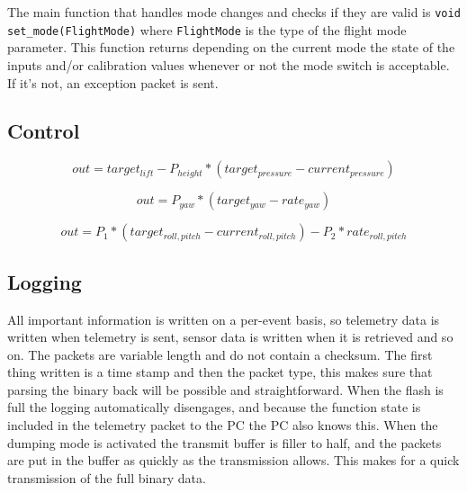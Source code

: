 \documentclass[final]{article}
\begin{document}
The main function that handles mode changes and checks if they are valid is \texttt{void set\_mode(FlightMode)} where \texttt{FlightMode} is the type of the flight mode parameter.
This function returns depending on the current mode the state of the inputs and/or calibration values whenever or not the mode switch is acceptable.
If it's not, an exception packet is sent.

\subsection{Control}

\begin{equation}
out = target_{lift} - P_{height} * (target_{pressure} - current_{pressure})
\label{eq:control-height}
\end{equation}

\begin{equation}
out = P_{yaw} * (target_{yaw} - rate_{yaw})
\label{eq:control-yaw}
\end{equation}

\begin{equation}
out = P_1 * (target_{roll,pitch} - current_{roll,pitch}) - P_2 * rate_{roll,pitch}
\label{eq:control-roll-pitch}
\end{equation}


\subsection{Logging}
All important information is written on a per-event basis, so telemetry data is written when telemetry is sent, sensor data is written when it is retrieved and so on.
The packets are variable length and do not contain a checksum.
The first thing written is a time stamp and then the packet type, this makes sure that parsing the binary back will be possible and straightforward.
When the flash is full the logging automatically disengages, and because the function state is included in the telemetry packet to the PC the PC also knows this.
When the dumping mode is activated the transmit buffer is filler to half, and the packets are put in the buffer as quickly as the transmission allows.
This makes for a quick transmission of the full binary data.
\end{document}
